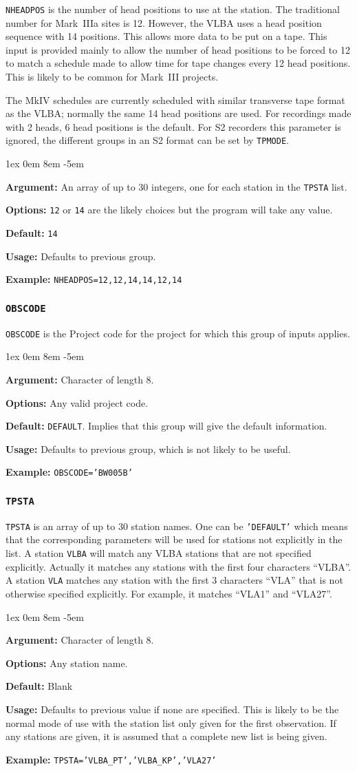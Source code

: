 \documentclass{report}
\newcommand{\rcwbox}[5]{
  \begin{list}{}{\parsep 1ex  \itemsep 0em
                 \leftmargin 8em  \itemindent -5em }
    \item {\bf Argument:} #1
    \item {\bf Options:}  #2
    \item {\bf Default:}  #3
    \item {\bf Usage:}    #4
    \item {\bf Example:}  #5
  \end{list}
}
\begin{document}
{\tt NHEADPOS} is the number of head positions to use at the
station. The traditional number for Mark~IIIa sites is 12. However,
the VLBA uses a head position sequence with 14 positions. This allows
more data to be put on a tape. This input is provided mainly to allow
the number of head positions to be forced to 12 to match a schedule
made to allow time for tape changes every 12 head positions. This is
likely to be common for Mark~III projects.

The MkIV schedules are currently scheduled with similar
transverse tape format as the VLBA; normally the same 14 head
positions are used. For recordings made with 2 heads, 6 head
positions is the default.
For S2 recorders this parameter is ignored, the
different groups in an S2 format can be set by {\tt TPMODE}.


\rcwbox
{An array of up to 30 integers, one for each station in the
{\tt TPSTA} list.}
{{\tt 12} or {\tt 14} are the likely choices but the program will
take any value.}
{{\tt 14}}
{Defaults to previous group.}
{{\tt NHEADPOS=12,12,14,14,12,14}}

\subsubsection{\label{TP:OBSCODE}{\tt OBSCODE}}

{\tt OBSCODE} is the Project code for the project for which this
group of inputs applies.

\rcwbox
{Character of length 8.}
{Any valid project code.}
{{\tt DEFAULT}. Implies that this group will give the default
information.}
{Defaults to previous group, which is not likely to be useful.}
{{\tt OBSCODE='BW005B'}}

\subsubsection{\label{TP:TPSTA}{\tt TPSTA}}

{\tt TPSTA} is an array of up to 30 station names. One can be
{\tt 'DEFAULT'} which means that the corresponding parameters will be
used for stations not explicitly in the list.  A station {\tt VLBA}
will match any VLBA stations that are not specified explicitly.  Actually
it matches any stations with the first four characters ``VLBA''.
A station {\tt VLA} matches any station with the first 3 characters
``VLA'' that is not otherwise specified explicitly.  For example, it
matches ``VLA1'' and ``VLA27''.

\rcwbox
{Character of length 8.}
{Any station name.}
{Blank}
{Defaults to previous value if none are specified. This is likely to
be the normal mode of use with the station list only given for the
first observation. If any stations are given, it is assumed that a
complete new list is being given.}
{{\tt TPSTA='VLBA\_PT','VLBA\_KP','VLA27'}}
\end{document}
